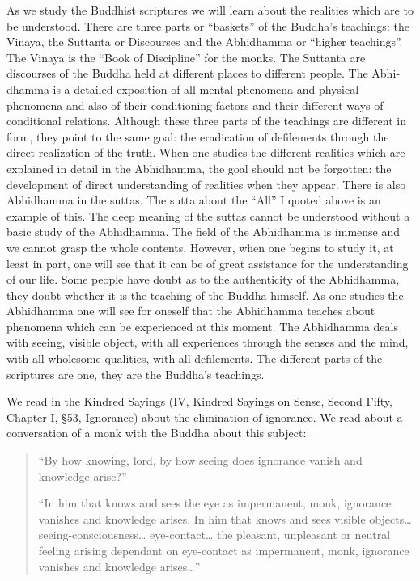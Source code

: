 \documentclass{book}
\begin{document}
As we study the Buddhist scriptures we will learn about the realities
which are to be understood. There are three parts or ``baskets'' of the
Buddha's teachings: the Vinaya, the Suttanta or Discourses and the
Abhidhamma or ``higher teachings''. The Vinaya is the ``Book of
Discipline'' for the monks. The Suttanta are discourses of the Buddha
held at different places to different people. The Abhi­dhamma is a
detailed exposition of all mental phenomena and physical phenomena and
also of their conditioning factors and their different ways of
conditional relations. Although these three parts of the teachings are
different in form, they point to the same goal: the eradication of
defilements through the direct realization of the truth. When one
studies the different realities which are explained in detail in the
Abhidhamma, the goal should not be forgotten: the development of direct
understanding of realities when they appear. There is also Abhidhamma in
the suttas. The sutta about the ``All'' I quoted above is an example of
this. The deep meaning of the suttas cannot be understood without a
basic study of the Abhidhamma. The field of the Abhidhamma is immense
and we cannot grasp the whole contents. However, when one begins to
study it, at least in part, one will see that it can be of great
assistance for the understanding of our life. Some people have doubt as
to the authenticity of the Abhidhamma, they doubt whether it is the
teaching of the Buddha himself. As one studies the Abhidhamma one will
see for oneself that the Abhidhamma teaches about phenomena which can be
experienced at this moment. The Abhi­dhamma deals with seeing, visible
object, with all experi­ences through the senses and the mind, with all
whole­some qualities, with all defilements. The different parts of the
scriptures are one, they are the Buddha's teachings.

We read in the Kindred Sayings (IV, Kindred Sayings on Sense, Second
Fifty, Chapter I, §53, Ignorance) about the elimination of ignorance. We
read about a conversation of a monk with the Buddha about this subject:

\begin{quote}
``By how knowing, lord, by how seeing does ignorance vanish and
knowledge arise?''

``In him that knows and sees the eye as impermanent, monk, ignorance
vanishes and knowledge arises. In him that knows and sees visible
objects\ldots{} seeing-consciousness\ldots{} eye-contact\ldots{} the
pleasant, unpleasant or neutral feeling arising dependant on eye-contact
as impermanent, monk, ignorance vanishes and knowledge arises\ldots{}''
\end{quote}
\end{document}
